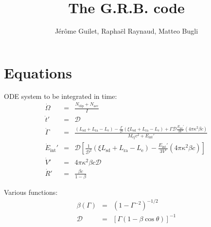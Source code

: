 \documentclass[11pt]{article} %
\title{The G.R.B. code}
\author{J\'er\^ome Guilet, Rapha\"el Raynaud, Matteo Bugli}
\newcommand{\tx}[1]{\textrm{#1}}
\begin{document}
\maketitle

\section{Equations}

ODE system to be integrated in time:
\begin{eqnarray}
\dot{\Omega}    &=& \frac{N_\tx{dip}+N_\tx{acc}}{I} \\
\dot{t}'               &=& \mathcal{D} \\
\dot{\Gamma}   &=& \frac{(L_\tx{sd}+L_\tx{ra}-L_\tx{e})-
                                             \tfrac{\Gamma}{\mathcal{D}}(\xi L_\tx{sd}+L_\tx{ra}-L_\tx{e})+
                                             \Gamma\mathcal{D}\tfrac{E_\tx{int}'}{3V'}(4\pi\kappa^2\beta c)}
                                           {M_\tx{ej}c^2+E_\tx{int}'} \\
\dot{E}_\tx{int}' &=& \mathcal{D}\left[\tfrac{1}{\mathcal{D}^2}(\xi L_\tx{sd}+L_\tx{ra}-L_\tx{e})-
                                                               \tfrac{E_\tx{int}'}{3V'}(4\pi\kappa^2\beta c)\right] \\
\dot{V}'             &=& 4\pi\kappa^2\beta c \mathcal{D} \\
\dot{R}'             &=& \frac{\beta c}{1-\beta}
\end{eqnarray}

Various functions:
\begin{eqnarray}
\beta(\Gamma) &=& (1-\Gamma^{-2})^{-1/2} \\
\mathcal{D}       &=& [\Gamma(1-\beta\cos\theta)]^{-1} 
\end{eqnarray}
\end{document}
